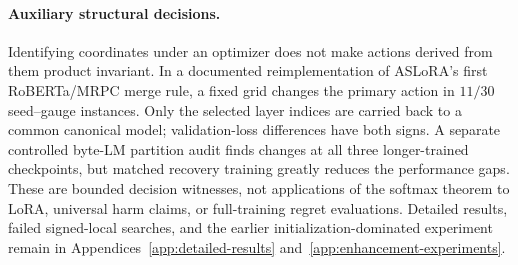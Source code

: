 \paragraph{Auxiliary structural decisions.}
Identifying coordinates under an optimizer does not make actions derived
from them product invariant. In a documented reimplementation of ASLoRA's
first RoBERTa/MRPC merge rule, a fixed grid changes the primary action in
$11/30$ seed--gauge instances. Only the selected layer indices are carried
back to a common canonical model; validation-loss differences have both
signs. A separate controlled byte-LM partition audit finds changes at all
three longer-trained checkpoints, but matched recovery training greatly
reduces the performance gaps. These are bounded decision witnesses, not
applications of the softmax theorem to LoRA, universal harm claims, or
full-training regret evaluations. Detailed results, failed signed-local
searches, and the earlier initialization-dominated experiment remain in
Appendices~\ref{app:detailed-results} and~\ref{app:enhancement-experiments}.
